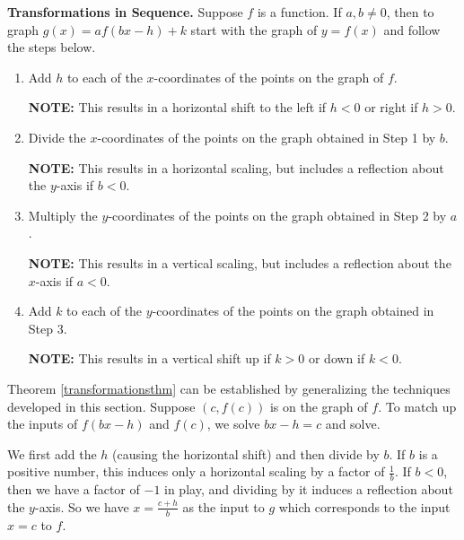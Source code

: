 \documentclass{ximera}
\begin{document}
\begin{theorem} \label{transformationsthm}\textbf{Transformations in Sequence.}  Suppose $f$ is a function.  If $a, b \neq 0$, then to graph $g(x) = a f(bx-h)+k$ start with the graph of $y=f(x)$ and follow the steps below.

\begin{enumerate}

\item  Add $h$ to each of the $x$-coordinates of the points on the graph of $f$.  

\textbf{NOTE:} This results in a horizontal shift to the left if $h < 0$ or right if $h > 0$.

\item  Divide the $x$-coordinates of the points on the graph obtained in Step 1 by $b$.  

\textbf{NOTE:} This results in a horizontal scaling, but includes a reflection about the $y$-axis if $b < 0$.

\item  Multiply the $y$-coordinates of the points on the graph obtained in Step 2 by $a$.   

\textbf{NOTE:} This results in a vertical scaling, but  includes a reflection about the $x$-axis if $a < 0$.

\item  Add $k$ to each of the $y$-coordinates of the points on the graph obtained in Step 3.  

\textbf{NOTE:} This results in a vertical shift up if $k > 0$ or down if $k < 0$.

\end{enumerate}

\end{theorem}


\bigskip

Theorem \ref{transformationsthm} can be established by generalizing the techniques developed in this section.  Suppose $(c,f(c))$ is on the graph of $f$. To match up the inputs of $f(bx-h)$ and $f(c)$, we solve $bx-h = c$ and solve.  

\smallskip

We first add the $h$ (causing the horizontal shift) and then divide by $b$.  If $b$ is a positive number, this induces only a horizontal scaling by a factor of $\frac{1}{b}$.  If  $b<0$, then we have a factor of $-1$ in play, and dividing by it induces a reflection about the $y$-axis.  So we have $x = \frac{c+h}{b}$ as the input to $g$ which corresponds to the input $x=c$ to $f$.  
\end{document}
